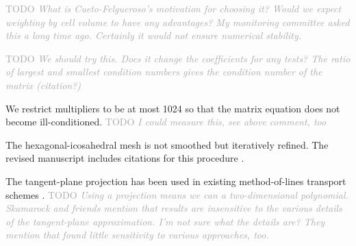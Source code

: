 \documentclass[times]{elsarticle}
\newcommand{\TODO}[1]{\textcolor{darkgray}{TODO \textit{#1}}}
\begin{document}
\TODO{What is Cueto-Felgueroso's motivation for choosing it?  Would we expect weighting by cell volume to have any advantages?  My monitoring committee asked this a long time ago.  Certainly it would not ensure numerical stability.}

\begin{quotation}
\begin{comment}
\item The singular value test should be relative to the largest singular value.
\end{comment}
\end{quotation}
\TODO{We should try this.  Does it change the coefficients for any tests?  The ratio of largest and smallest condition numbers gives the condition number of the matrix (citation?)}

\begin{quotation}
\begin{comment}
\item The weighting can degrade the condition number of the least squares problem.
\end{comment}
\end{quotation}
We restrict multipliers to be at most 1024 so that the matrix equation does not become ill-conditioned.  \TODO{I could measure this, see above comment, too}

\begin{quotation}
\begin{comment}
\item Is there a smoothing of hexagonal-icosahedral mesh after refinement.
\end{comment}
\end{quotation}
The hexagonal-icosahedral mesh is not smoothed but iteratively refined.  The revised manuscript includes citations for this procedure \citep{heikes-randall1995a,heikes-randall1995b}.

\begin{quotation}
\begin{comment}
Can you comment on the projection to the tangent plane for the spherical test example. 
Note that projection to another grid can change the interpolation/approximation essentially, 
like the transformation of a boundary following grid in physical space to a Cartesian grid in 
computational space. Why is the interpolation/approximation not done in 3 dimensional 
physical space.
\end{comment}
\end{quotation}
The tangent-plane projection has been used in existing method-of-lines transport schemes \citep{skamarock-menchaca2010,skamarock-gassmann2011}.
\TODO{Using a projection means we can a two-dimensional polynomial.  Skamarock and friends mention that results are insensitive to the various details of the tangent-plane approximation.  I'm not sure what the details are?  They mention that \citep{lashley2002} found little sensitivity to various approaches, too.}
\end{document}
